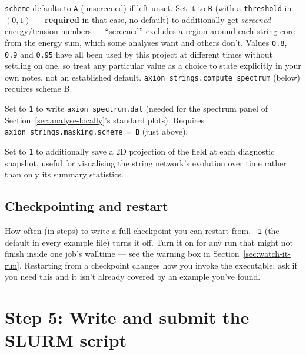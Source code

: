 \documentclass[11pt]{article}
\begin{document}
\begin{description}[style=nextline,leftmargin=1.2em,itemsep=0.4em]
\item[\texttt{axion\_strings.masking.scheme}, \texttt{axion\_strings.masking.threshold}]
  \texttt{scheme} defaults to \texttt{A} (unscreened) if left unset. Set it to \texttt{B} (with a
  \texttt{threshold} in $(0,1)$ --- \textbf{required} in that case, no default) to additionally get
  \emph{screened} energy/tension numbers --- ``screened'' excludes a region around each string core from
  the energy sum, which some analyses want and others don't. Values \texttt{0.8}, \texttt{0.9} and
  \texttt{0.95} have all been used by this project at different times without settling on one, so treat any
  particular value as a choice to state explicitly in your own notes, not an established default.
  \texttt{axion\_strings.compute\_spectrum} (below) requires scheme B.
\item[\texttt{axion\_strings.compute\_spectrum}]
  Set to \texttt{1} to write \texttt{axion\_spectrum.dat} (needed for the spectrum panel of
  Section~\ref{sec:analyse-locally}'s standard plots). Requires \texttt{axion\_strings.masking.scheme = B}
  (just above).
\item[\texttt{axion\_strings.save\_projection}]
  Set to \texttt{1} to additionally save a 2D projection of the field at each diagnostic snapshot, useful
  for visualising the string network's evolution over time rather than only its summary statistics.
\end{description}

\subsection{Checkpointing and restart}

\begin{description}[style=nextline,leftmargin=1.2em,itemsep=0.4em]
\item[\texttt{amr.check\_int}]
  How often (in steps) to write a full checkpoint you can restart from. \texttt{-1} (the default in every
  example file) turns it off. Turn it on for any run that might not finish inside one job's walltime --- see
  the warning box in Section~\ref{sec:watch-it-run}. Restarting from a checkpoint changes how you invoke the
  executable; ask if you need this and it isn't already covered by an example you've found.
\end{description}

\section{Step 5: Write and submit the SLURM script}
\label{sec:submitting}
\end{document}
